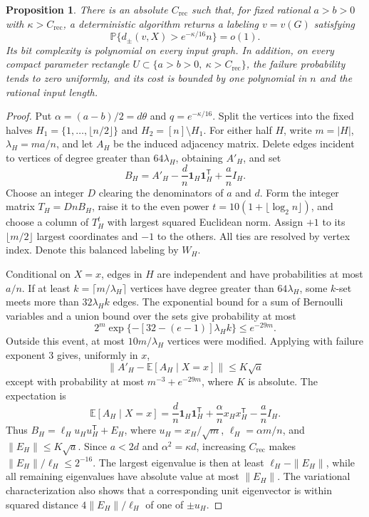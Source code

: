 \documentclass[11pt]{article}
\def\P{\mathbb{P}}
\def\E{\mathbb{E}}
\newtheorem{proposition}[thm]{Proposition}
\numberwithin{equation}{section}
\begin{document}
\begin{proposition}\label{fd:recovery}
There is an absolute $C_{\mathrm{rec}}$ such that, for fixed rational $a>b>0$ with $\kappa>C_{\mathrm{rec}}$, a deterministic algorithm returns a labeling $v=v(G)$ satisfying
\[
 \P\{d_\pm(v,X)>e^{-\kappa/16}n\}=o(1).
\]
Its bit complexity is polynomial on every input graph. In addition, on every compact parameter rectangle $U\subset\{a>b>0,\ \kappa>C_{\mathrm{rec}}\}$, the failure probability tends to zero uniformly, and its cost is bounded by one polynomial in $n$ and the rational input length.
\end{proposition}

\begin{proof}
Put $\alpha=(a-b)/2=d\theta$ and $q=e^{-\kappa/16}$. Split the vertices into the fixed halves $H_1=\{1,\ldots,\lfloor n/2\rfloor\}$ and $H_2=[n]\setminus H_1$. For either half $H$, write $m=|H|$, $\lambda_H=ma/n$, and let $A_H$ be the induced adjacency matrix. Delete edges incident to vertices of degree greater than $64\lambda_H$, obtaining $A'_H$, and set
\[
 B_H=A'_H-\frac dn\mathbf1_H\mathbf1_H^{\mathsf T}+\frac an I_H.
\]
Choose an integer $D$ clearing the denominators of $a$ and $d$. Form the integer matrix $T_H=DnB_H$, raise it to the even power
$t=10(1+\lfloor\log_2 n\rfloor)$, and choose a column of $T_H^t$ with largest squared Euclidean norm. Assign $+1$ to its $\lfloor m/2\rfloor$ largest coordinates and $-1$ to the others. All ties are resolved by vertex index. Denote this balanced labeling by $W_H$.

Conditional on $X=x$, edges in $H$ are independent and have probabilities at most $a/n$. If at least $k=\lceil m/\lambda_H\rceil$ vertices have degree greater than $64\lambda_H$, some $k$-set meets more than $32\lambda_Hk$ edges. The exponential bound for a sum of Bernoulli variables and a union bound over the sets give probability at most
\[
 2^m\exp\{-[32-(e-1)]\lambda_Hk\}\le e^{-29m}.
\]
Outside this event, at most $10m/\lambda_H$ vertices were modified. Applying \cite[Theorem~2.1]{LLV17} with failure exponent $3$ gives, uniformly in $x$,
\[
 \|A'_H-\E[A_H\mid X=x]\|\le K\sqrt a
\]
except with probability at most $m^{-3}+e^{-29m}$, where $K$ is absolute. The expectation is
\[
 \E[A_H\mid X=x]=\frac dn\mathbf1_H\mathbf1_H^{\mathsf T}
   +\frac\alpha n x_Hx_H^{\mathsf T}-\frac an I_H.
\]
Thus $B_H=\ell_Hu_Hu_H^{\mathsf T}+E_H$, where $u_H=x_H/\sqrt m$, $\ell_H=\alpha m/n$, and $\|E_H\|\le K\sqrt a$. Since $a<2d$ and $\alpha^2=\kappa d$, increasing $C_{\mathrm{rec}}$ makes $\|E_H\|/\ell_H\le2^{-16}$. The largest eigenvalue is then at least $\ell_H-\|E_H\|$, while all remaining eigenvalues have absolute value at most $\|E_H\|$. The variational characterization also shows that a corresponding unit eigenvector is within squared distance $4\|E_H\|/\ell_H$ of one of $\pm u_H$.


\end{proof}
\end{document}
